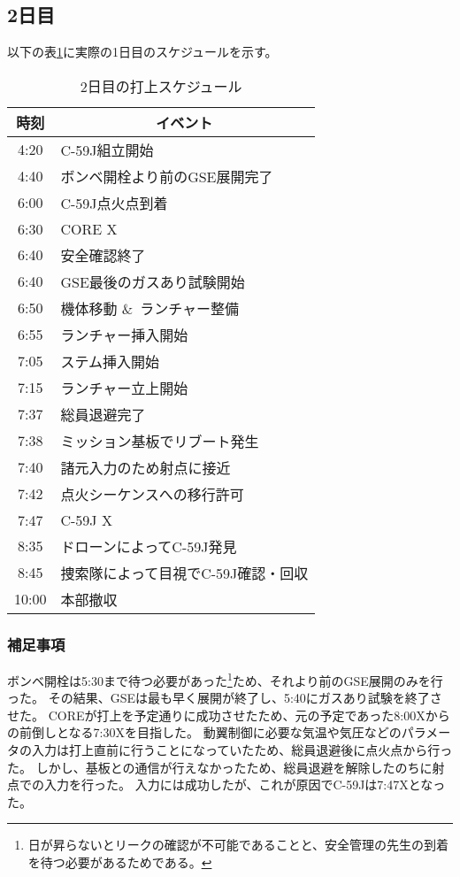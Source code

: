 \documentclass[a4paper,11pt,titlepage,uplatex]{jsarticle}
\begin{document}
\subsection{2日目}
以下の表\ref{tab:search_2nitime}に実際の1日目のスケジュールを示す。
\begin{table}[H]
    \centering
    \caption{2日目の打上スケジュール}
    \begin{tabular}{cl} \toprule
        時刻 & \multicolumn{1}{c}{イベント}  \\ \midrule
        4:20 & C-59J組立開始 \\
        4:40 & ボンベ開栓より前のGSE展開完了 \\
        6:00 & C-59J点火点到着 \\
        6:30 & CORE X \\
        6:40 & 安全確認終了 \\
        6:40 & GSE最後のガスあり試験開始 \\
        6:50 & 機体移動 \&\ ランチャー整備　\\
        6:55 & ランチャー挿入開始 \\
        7:05 & ステム挿入開始 \\
        7:15 & ランチャー立上開始 \\
        7:37 & 総員退避完了 \\
        7:38 & ミッション基板でリブート発生 \\
        7:40 & 諸元入力のため射点に接近 \\        
        7:42 & 点火シーケンスへの移行許可 \\
        7:47 & C-59J X \\
        8:35 & ドローンによってC-59J発見 \\
        8:45 & 捜索隊によって目視でC-59J確認・回収\\
        10:00 & 本部撤収\\
        \bottomrule
    \end{tabular}
    \label{tab:search_2nitime}
\end{table}

\subsubsection*{補足事項}
ボンベ開栓は5:30まで待つ必要があった\footnote{日が昇らないとリークの確認が不可能であることと、安全管理の先生の到着を待つ必要があるためである。}ため、それより前のGSE展開のみを行った。
その結果、GSEは最も早く展開が終了し、5:40にガスあり試験を終了させた。
COREが打上を予定通りに成功させたため、元の予定であった8:00Xからの前倒しとなる7:30Xを目指した。
動翼制御に必要な気温や気圧などのパラメータの入力は打上直前に行うことになっていたため、総員退避後に点火点から行った。
しかし、基板との通信が行えなかったため、総員退避を解除したのちに射点での入力を行った。
入力には成功したが、これが原因でC-59Jは7:47Xとなった。
\end{document}
